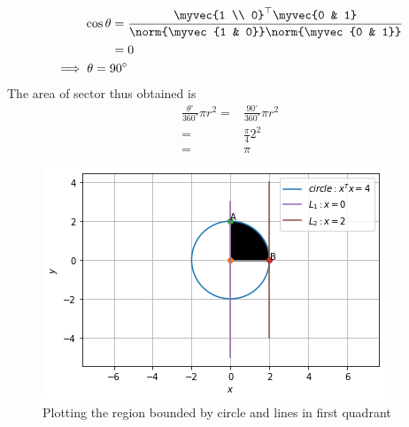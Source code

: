 \begin{align}
\cos \theta = {}&\frac{\myvec{1 \\ 0}^\top \myvec{0 & 1}}{\norm{\myvec{1 & 0}}\norm{\myvec{0 & 1}}}\\
\label{sep/2/6/eq:11}
={}& 0\\
\label{sep/2/6/eq:12}
\implies \theta = 90^{\circ}
\end{align}
The area of sector thus obtained is
\begin{align}
\label{sep/2/6/eq;13}
\frac{\theta^{\circ}}{360^{\circ}}\pi r^2 ={}&\frac{90^{\circ}}{360^{\circ}}\pi r^2\\
\label{sep/2/6/eq:14}
={}&\frac{\pi}{4}2^2\\
\label{sep/2/6/eq:15}
={}&\pi
\end{align}
\begin{figure}[!ht]
\centering
\includegraphics[width=\columnwidth]{solutions/sep/2/6/Figures/q5}
\caption{Plotting the region bounded by circle and lines in first quadrant}
\label{sep/2/6/fig}
\end{figure}

		

